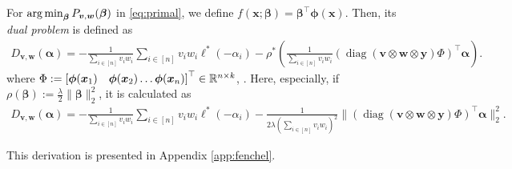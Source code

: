 \begin{definition} \label{def:dual}
For $\operatorname*{arg\,min}_{\bm\beta} P_{\bm v,\bm w}(\bm \beta)$ in \eqref{eq:primal}, we define $f(\bm x; \bm\beta) = \bm{\beta}^\top \bm\phi(\bm x)$. Then, its {\em dual problem} is defined as
\begin{align}
\label{eq:dual}
D_{\bm v,\bm w}(\bm\alpha) = - \frac{1}{\sum_{i\in[n]} v_i w_i}\sum_{i\in[n]} v_i w_i \ell^*(-\alpha_i) - \rho^*\left(\frac{1}{\sum_{i\in[n]} v_i w_i}(\operatorname{diag}(\bm v\otimes\bm w \otimes \bm y) \Phi)^\top\bm\alpha \right).
\end{align}
where $\Phi:=\left[\bm\phi(\bm x_1)\quad\bm\phi(\bm x_2) \ldots \bm\phi(\bm x_n)\right]^{\top} \in \mathbb{R}^{n\times k}$, .
%
Here, especially, if $\rho(\bm\beta) := \frac{\lambda}{2}\|\bm\beta\|_2^2$, it is calculated as
\begin{align}
D_{\bm v,\bm w}(\bm\alpha) = - \frac{1}{\sum_{i\in[n]} v_i w_i}\sum_{i\in[n]} v_i w_i \ell^*(-\alpha_i) - \frac{1}{2\lambda\left(\sum_{i\in[n]} v_i w_i\right)^2}\| (\operatorname{diag}(\bm v\otimes\bm w \otimes \bm y) \Phi)^\top\bm\alpha \|_2^2.
\end{align}
\end{definition}
This derivation is presented in Appendix \ref{app:fenchel}.

